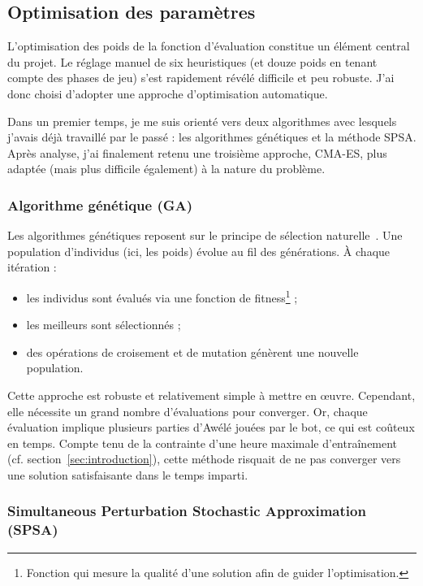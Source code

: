 \documentclass[11pt,a4paper]{article}
\begin{document}
\subsection{Optimisation des paramètres}

L'optimisation des poids de la fonction d'évaluation constitue un élément central du projet. Le réglage manuel
de six heuristiques (et douze poids en tenant compte des phases de jeu) s'est rapidement révélé difficile et peu robuste. J'ai donc choisi d'adopter une approche d'optimisation automatique.

Dans un premier temps, je me suis orienté vers deux algorithmes avec lesquels j'avais déjà travaillé par le passé : les algorithmes
génétiques et la méthode SPSA. Après analyse, j'ai finalement retenu une troisième approche, CMA-ES, plus adaptée (mais plus
difficile également) à la nature du problème.

\subsubsection{Algorithme génétique (GA)}

Les algorithmes génétiques reposent sur le principe de sélection naturelle~\cite{WikiGA}. Une population d'individus (ici, les poids) évolue au fil
des générations. À chaque itération :

\begin{itemize}
  \item les individus sont évalués via une fonction de fitness\footnote{Fonction qui mesure la qualité d’une solution afin de guider l’optimisation.} ;
  \item les meilleurs sont sélectionnés ;
  \item des opérations de croisement et de mutation génèrent une nouvelle population.
\end{itemize}

Cette approche est robuste et relativement simple à mettre en œuvre. Cependant, elle nécessite un grand nombre d'évaluations pour
converger. Or, chaque évaluation implique plusieurs parties d'Awélé jouées par le bot, ce qui est coûteux en temps. Compte tenu
de la contrainte d'une heure maximale d'entraînement (cf. section~\ref{sec:introduction}), cette méthode risquait de ne pas converger
vers une solution satisfaisante dans le temps imparti.

\subsubsection{Simultaneous Perturbation Stochastic Approximation (SPSA)}
\end{document}
